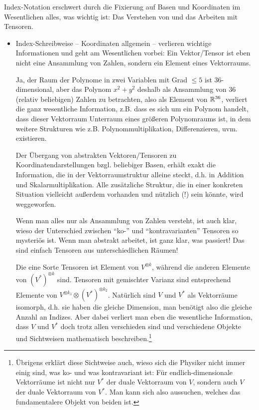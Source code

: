 \begin{remark}
Index-Notation erschwert durch die Fixierung auf Basen und Koordinaten im Wesentlichen alles, was wichtig ist: Das Verstehen von und das Arbeiten mit Tensoren.

\begin{itemize}
\item Index-Schreibweise -- Koordinaten allgemein -- verlieren wichtige Informationen und geht am Wesentlichen vorbei: Ein Vektor/Tensor ist eben nicht eine Ansammlung von Zahlen, sondern ein Element eines Vektorraums.

Ja, der Raum der Polynome in zwei Variablen mit Grad $\leq 5$ ist 36-dimensional, aber das Polynom $x^2+y^2$ deshalb als Ansammlung von 36 (relativ beliebigen) Zahlen zu betrachten, also als Element von $\mathbb{R}^{36}$, verliert die ganz wesentliche Information, z.B. dass es sich um ein Polynom handelt, dass dieser Vektorraum Unterraum eines größeren Polynomraums ist, in dem weitere Strukturen wie z.B. Polynommultiplikation, Differenzieren, uvm. existieren.

Der Übergang von abstrakten Vektoren/Tensoren zu Koordinatendarstellungen bzgl. beliebiger Basen, erhält exakt die Information, die in der Vektorraumstruktur alleine steckt, d.h. in Addition und Skalarmultiplikation. Alle zusätzliche Struktur, die in einer konkreten Situation vielleicht außerdem vorhanden und nützlich (!) sein könnte, wird weggeworfen.

Wenn man alles nur als Ansammlung von Zahlen versteht, ist auch klar, wieso der Unterschied zwischen \enquote{ko-} und \enquote{kontravarianten} Tensoren so mysteriös ist. Wenn man abstrakt arbeitet, ist ganz klar, was passiert! Das sind einfach Tensoren aus unterschiedlichen Räumen!

Die eine Sorte Tensoren ist Element von $V^{\otimes k}$, während die anderen Elemente von $(V^\ast)^{\otimes k}$ sind. Tensoren mit gemischter Varianz sind entsprechend Elemente von $V^{\otimes k_1}\otimes (V^\ast)^{\otimes k_2}$. Natürlich sind $V$ und $V^\ast$ als Vektorräume isomorph, d.h. sie haben die gleiche Dimension, man benötigt also die gleiche Anzahl an Indizes. Aber dabei verliert man eben die wesentliche Information, dass $V$ und $V^\ast$ doch trotz allen verschieden sind und verschiedene Objekte und Sichtweisen mathematisch beschreiben.\footnote{Übrigens erklärt diese Sichtweise auch, wieso sich die Physiker nicht immer einig sind, was ko- und was kontravariant ist: Für endlich-dimensionale Vektorräume ist nicht nur $V^\ast$ der duale Vektorraum von $V$, sondern auch $V$ der duale Vektorraum von $V^\ast$. Man kann sich also aussuchen, welches das fundamentalere Objekt von beiden ist.}


\end{itemize}
\end{remark}
